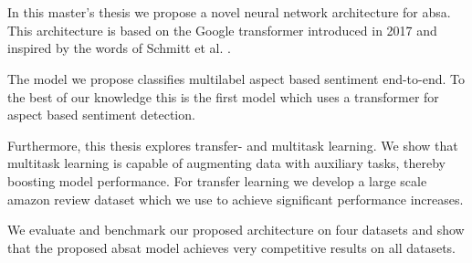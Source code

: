\chapter{\abstractname}

In this master's thesis we propose a novel neural network architecture for \acrfull{absa}. This architecture is based on the Google transformer introduced in 2017 \cite{Vaswani2017} and inspired by the words of Schmitt et al. \cite{Schmitt2018}.
\medskip

The model we propose classifies multilabel aspect based sentiment end-to-end. To the best of our knowledge this is the first model which uses a transformer for aspect based sentiment detection.
\medskip

Furthermore, this thesis explores transfer- and multitask learning. We show that multitask learning is capable of augmenting data with auxiliary tasks, thereby boosting model performance. For transfer learning we develop a large scale amazon review dataset which we use to achieve significant performance increases.
\medskip

We evaluate and benchmark our proposed architecture on four datasets and show that the proposed \acrfull{absat} model achieves very competitive results on all datasets.


